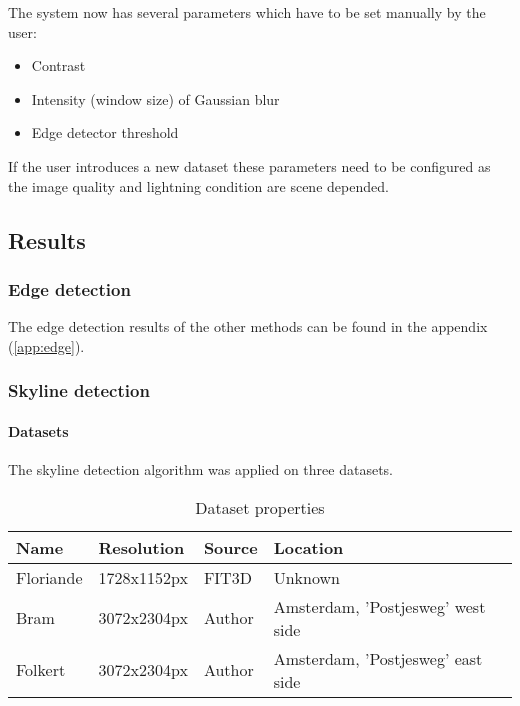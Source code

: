 The system now has several parameters which have to be set manually by the user:
\begin{itemize}
	\item Contrast
	\item Intensity (window size) of Gaussian blur
	\item Edge detector threshold
\end{itemize}

If the user introduces a new dataset these parameters need to be configured
as the image quality and lightning condition are scene depended.


\subsection{Results}
\subsubsection{Edge detection}
\label{sec:ResultEdge}
The edge detection results of the other methods can be found in the appendix
(\ref{app:edge}).
\clearpage


\subsubsection{Skyline detection}
\paragraph{Datasets}
The skyline detection algorithm was applied on three datasets. 

\begin{table}[ht]
\caption{Dataset properties}
\begin{tabular}{|l||l|l|l|}
\hline
Name 	& Resolution 	& Source	& Location\\
\hline
\hline
Floriande & 1728x1152px  & FIT3D \cite{FIT3D}  	& Unknown\\
\hline
Bram	 & 3072x2304px  & Author					& Amsterdam, 'Postjesweg' west side\\
\hline
Folkert  & 3072x2304px  & Author					& Amsterdam, 'Postjesweg' east side\\
\hline
\end{tabular}
\end{table}

